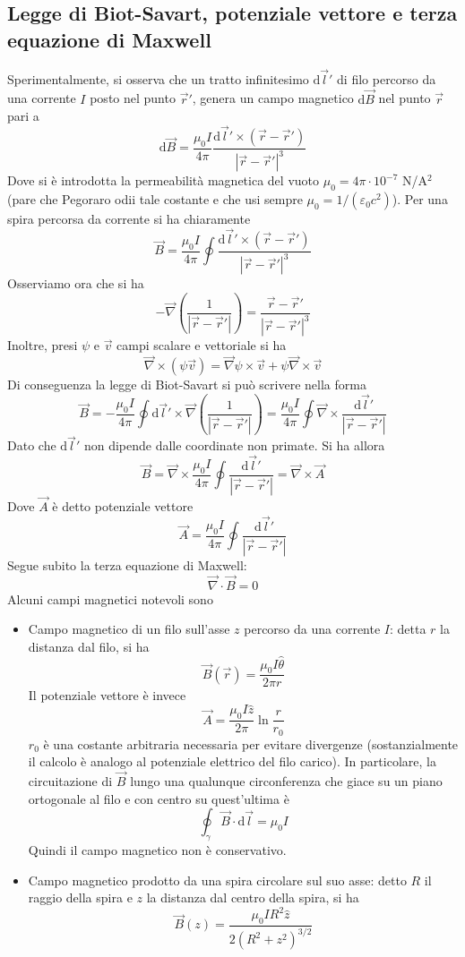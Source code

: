 \documentclass[a4paper,11pt]{book}
\let\oldnabla\nabla
\renewcommand{\nabla}{\vec{\oldnabla}}
\newcommand{\dif}{\mathrm{d}}
\let\oldepsilon\epsilon
\let\oldvarepsilon\varepsilon
\renewcommand{\epsilon}{\oldvarepsilon}
\renewcommand{\varepsilon}{\oldepsilon}
\theoremstyle{definition}
\theoremstyle{theorem}
\begin{document}
\subsection{Legge di Biot-Savart, potenziale vettore e terza equazione di Maxwell}
Sperimentalmente, si osserva che un tratto infinitesimo $\dif\vec{l}'$ di filo percorso da una corrente $I$ posto nel punto $\vec{r}'$, genera un campo magnetico $\dif\vec{B}$ nel punto $\vec{r}$ pari a
\[\dif\vec{B}=\frac{\mu_0I}{4\pi}\frac{\dif\vec{l}'\times(\vec{r}-\vec{r}')}{|\vec{r}-\vec{r}'|^3}\]
Dove si è introdotta la permeabilità magnetica del vuoto $\mu_0=4\pi\cdot10^{-7}$ N/A$^2$ (pare che Pegoraro odii tale costante e che usi sempre $\mu_0=1/(\epsilon_0c^2)$). Per una spira percorsa da corrente si ha chiaramente
\[\vec{B}=\frac{\mu_0I}{4\pi}\oint\frac{\dif\vec{l}'\times(\vec{r}-\vec{r}')}{|\vec{r}-\vec{r}'|^3}\]
Osserviamo ora che si ha
\[-\nabla\left(\frac{1}{|\vec{r}-\vec{r}'|}\right)=\frac{\vec{r}-\vec{r}'}{|\vec{r}-\vec{r}'|^3}\]
Inoltre, presi $\psi$ e $\vec{v}$ campi scalare e vettoriale si ha
\[\nabla\times(\psi\vec{v})=\nabla\psi\times\vec{v}+\psi\nabla\times\vec{v}\]
Di conseguenza la legge di Biot-Savart si può scrivere nella forma
\[\vec{B}=-\frac{\mu_0I}{4\pi}\oint\dif\vec{l}'\times\nabla\left(\frac{1}{|\vec{r}-\vec{r}'|}\right)=\frac{\mu_0I}{4\pi}\oint\nabla\times\frac{\dif\vec{l}'}{|\vec{r}-\vec{r}'|}\]
Dato che $\dif\vec{l}'$ non dipende dalle coordinate non primate. Si ha allora
\[\vec{B}=\nabla\times\frac{\mu_0I}{4\pi}\oint\frac{\dif\vec{l}'}{|\vec{r}-\vec{r}'|}=\nabla\times\vec{A}\]
Dove $\vec{A}$ è detto potenziale vettore
\[\vec{A}=\frac{\mu_0I}{4\pi}\oint\frac{\dif\vec{l}'}{|\vec{r}-\vec{r}'|}\]
Segue subito la terza equazione di Maxwell:
\[\nabla\cdot\vec{B}=0\]
Alcuni campi magnetici notevoli sono
\begin{itemize}
	\item Campo magnetico di un filo sull'asse $z$ percorso da una corrente $I$: detta $r$ la distanza dal filo, si ha
	\[\vec{B}(\vec{r})=\frac{\mu_0I\hat{\theta}}{2\pi r}\]
	Il potenziale vettore è invece
	\[\vec{A}=\frac{\mu_0I\hat{z}}{2\pi}\ln\frac{r}{r_0}\]
	$r_0$ è una costante arbitraria necessaria per evitare divergenze (sostanzialmente il calcolo è analogo al potenziale elettrico del filo carico). In particolare, la circuitazione di $\vec{B}$ lungo una qualunque circonferenza che giace su un piano ortogonale al filo e con centro su quest'ultima è
	\[\oint_{\gamma}\vec{B}\cdot\dif\vec{l}=\mu_0I\]
	Quindi il campo magnetico non è conservativo.
	\item Campo magnetico prodotto da una spira circolare sul suo asse: detto $R$ il raggio della spira e $z$ la distanza dal centro della spira, si ha
	\[\vec{B}(z)=\frac{\mu_0IR^2\hat{z}}{2(R^2+z^2)^{3/2}}\]
\end{itemize}
\end{document}
